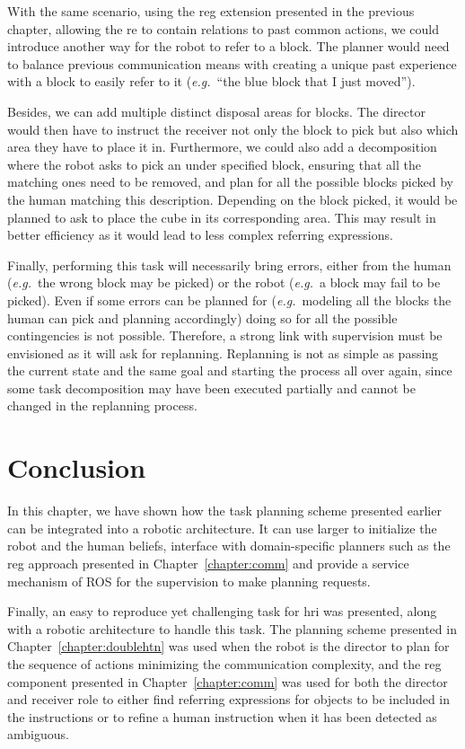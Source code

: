 \documentclass[a4paper,11pt,twoside]{StyleThese}
\begin{document}
With the same scenario, using the \acrshort{reg} extension presented in the previous chapter, allowing the \acrshort{re} to contain relations to past common actions, we could introduce another way for the robot to refer to a block. The planner would need to balance previous communication means with creating a unique past experience with a block to easily refer to it (\textit{e.g.}~``the blue block that I just moved'').

Besides, we can add multiple distinct disposal areas for blocks. The director would then have to instruct the receiver not only the block to pick but also which area they have to place it in. Furthermore, we could also add a decomposition where the robot asks to pick an under specified block, ensuring that all the matching ones need to be removed, and plan for all the possible blocks picked by the human matching this description. Depending on the block picked, it would be planned to ask to place the cube in its corresponding area. This may result in better efficiency as it would lead to less complex referring expressions.

Finally, performing this task will necessarily bring errors, either from the human (\textit{e.g.}~the wrong block may be picked) or the robot (\textit{e.g.}~a block may fail to be picked). Even if some errors can be planned for (\textit{e.g.}~modeling all the blocks the human can pick and planning accordingly) doing so for all the possible contingencies is not possible. Therefore, a strong link with supervision must be envisioned as it will ask for replanning. Replanning is not as simple as passing the current state and the same goal and starting the process all over again, since some task decomposition may have been executed partially and cannot be changed in the replanning process.


\section{Conclusion}
In this chapter, we have shown how the task planning scheme presented earlier can be integrated into a robotic architecture. It can use larger  to initialize the robot and the human beliefs, interface with domain-specific planners such as the \acrshort{reg} approach presented in Chapter~\ref{chapter:comm} and provide a service mechanism of ROS for the supervision to make planning requests.

Finally, an easy to reproduce yet challenging task for \acrshort{hri} was presented, along with a robotic architecture to handle this task. The planning scheme presented in Chapter~\ref{chapter:doublehtn} was used when the robot is the director to plan for the sequence of actions minimizing the communication complexity, and the \acrshort{reg} component presented in Chapter~\ref{chapter:comm} was used for both the director and receiver role to either find referring expressions for objects to be included in the instructions or to refine a human instruction when it has been detected as ambiguous.

\ifdefined{}
\else


\end{document}
